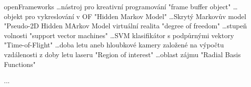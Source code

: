 
\abbrv[OF]	openFrameworks \dots nástroj pro kreativní programování
\abbrv[FBO]  "frame buffer object" \dots objekt pro vykreslování v OF
\abbrv[HMM]  "Hidden Markov Model" \dots Skrytý Markovův model
\abbrv[P2DHMM]  "Pseudo-2D Hidden MArkov Model
\abbrv[VR]  virtuální realita
\abbrv[DOF]  "degree of freedom" \dots stupeň volnosti
\abbrv[SVM]  "support vector machines" \dots SVM klasifikátor s podpůrnými vektory
\abbrv[ToF]  "Time-of-Flight" \dots doba letu aneb hloubkové kamery založené na výpočtu vzdálenosti z doby letu laseru
\abbrv[ROI]  "Region of interest" \dots oblast zájmu
\abbrv[RBF]  "Radial Basis Functions"

\abbrv[...]     ...
\stopAbbreviations

\endinput
